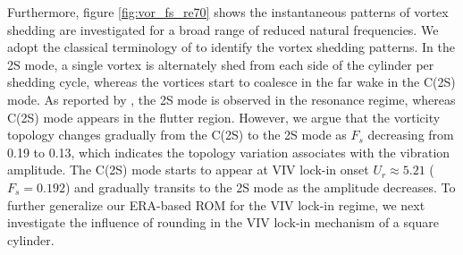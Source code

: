 \documentclass{jfm}
\begin{document}
%
Furthermore, figure \ref{fig:vor_fs_re70} shows the instantaneous patterns of vortex shedding are investigated for a broad range of reduced natural frequencies.
We adopt the classical 
terminology of \cite{williamson1988vortex}  to identify the vortex shedding patterns.
In the 2S mode, a single
vortex is alternately shed from each side of the cylinder per shedding cycle, 
whereas the vortices start to coalesce in the far wake in the C(2S) mode.
%
As reported by \cite{Zhang2015}, the 2S mode is observed in the resonance regime, 
whereas C(2S) mode appears in the flutter region. However, we argue that the vorticity topology 
changes gradually from the C(2S) to the 2S mode as $F_s$ decreasing from 0.19 to 0.13, which indicates the topology variation associates 
with the vibration amplitude. The C(2S) mode starts to appear at VIV lock-in onset $U_r\approx 5.21$ ($F_{s}=0.192$) 
and gradually transits to the 2S mode as the amplitude decreases. 
%
To further generalize our ERA-based ROM 
for the VIV lock-in regime, we next investigate the influence of rounding in the 
VIV lock-in mechanism of a square cylinder.



\end{document}
